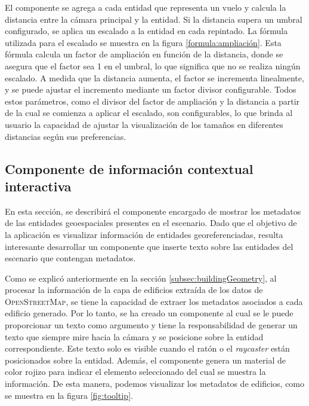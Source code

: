 \documentclass[a4paper, 11pt]{book}
\begin{document}
El componente se agrega a cada entidad que representa un vuelo y calcula la distancia entre la cámara principal y la entidad. Si la distancia supera un umbral configurado, se aplica un escalado a la entidad en cada repintado. La fórmula utilizada para el escalado se muestra en la figura \ref{formula:ampliación}. Esta fórmula calcula un factor de ampliación en función de la distancia, donde se asegura que el factor sea 1 en el umbral, lo que significa que no se realiza ningún escalado. A medida que la distancia aumenta, el factor se incrementa linealmente, y se puede ajustar el incremento mediante un factor divisor configurable. 
Todos estos parámetros, como el divisor del factor de ampliación y la distancia a partir de la cual se comienza a aplicar el escalado, son configurables, lo que brinda al usuario la capacidad de ajustar la visualización de los tamaños en diferentes distancias según sus preferencias.

\subsection{Componente de información contextual interactiva}
\label{subsec:tooltip}
En esta sección, se describirá el componente encargado de mostrar los metadatos de las entidades geoespaciales presentes en el escenario. Dado que el objetivo de la aplicación es visualizar información de entidades georeferenciadas, resulta interesante desarrollar un componente que inserte texto sobre las entidades del escenario que contengan metadatos.

Como se explicó anteriormente en la sección \ref{subsec:buildingGeometry}, al procesar la información de la capa de edificios extraída de los datos de \textsc{OpenStreetMap}, se tiene la capacidad de extraer los metadatos asociados a cada edificio generado. 
Por lo tanto, se ha creado un componente al cual se le puede proporcionar un texto como argumento y tiene la responsabilidad de generar un texto que siempre mire hacia la cámara y se posicione sobre la entidad correspondiente. 
Este texto solo es visible cuando el ratón o el \emph{raycaster} están posicionados sobre la entidad. Además, el componente genera un material de color rojizo para indicar el elemento seleccionado del cual se muestra la información. De esta manera, podemos visualizar los metadatos de edificios, como se muestra en la figura \ref{fig:tooltip}.
\end{document}
